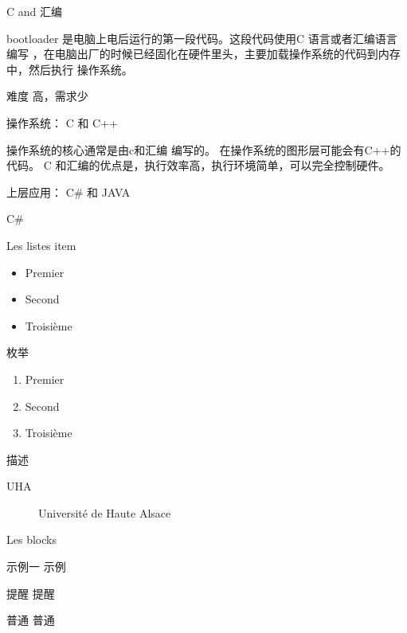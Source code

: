 \documentclass[10pt]{beamer}
\begin{document}
\begin{frame}[fragile]{C and 汇编}

bootloader 是电脑上电后运行的第一段代码。这段代码使用C 语言或者汇编语言编写
，在电脑出厂的时候已经固化在硬件里头，主要加载操作系统的代码到内存中，然后执行
操作系统。

难度 高，需求少
\end{frame}



\begin{frame}[fragile]{操作系统： C 和 C++ }

操作系统的核心通常是由c和汇编 编写的。 在操作系统的图形层可能会有C++的代码。
C 和汇编的优点是，执行效率高，执行环境简单，可以完全控制硬件。

\end{frame}


\begin{frame}[fragile]{上层应用： C\# 和 JAVA }

C\#

\end{frame}







\begin{frame}{Les listes}
	item
	\begin{itemize}
		\item Premier
		\item Second
		\item Troisième
	\end{itemize}

	枚举
	\begin{enumerate}
		\item Premier
		\item Second
		\item Troisième
	\end{enumerate}

	描述
	\begin{description}
		\item [UHA] Université de Haute Alsace
	\end{description}
\end{frame}

\begin{frame}{Les blocks}
	\begin{exampleblock}{示例一}
		示例
	\end{exampleblock}
	\begin{alertblock}{提醒}
		提醒
	\end{alertblock}
	\begin{block}{普通}
		普通
	\end{block}
\end{frame}
\end{document}
